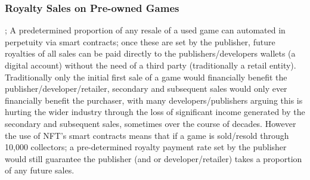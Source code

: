 \subsubsection{Royalty Sales on Pre-owned Games} ; A predetermined proportion
  of any resale of a used game can automated in perpetuity via smart
  contracts; once these are set by the publisher, future royalties of
  all sales can be paid directly to the publishers/developers wallets (a
  digital account) without the need of a third party (traditionally a
  retail entity). Traditionally only the initial first sale of a game
  would financially benefit the publisher/developer/retailer, secondary
  and subsequent sales would only ever financially benefit the
  purchaser, with many developers/publishers arguing this is hurting the
  wider industry through the loss of significant income generated by the
  secondary and subsequent sales, sometimes over the course of decades.
  However the use of NFT's smart contracts means that if a game is
  sold/resold through 10,000 collectors; a pre-determined royalty
  payment rate set by the publisher would still guarantee the publisher
  (and or developer/retailer) takes a proportion of any future sales.
